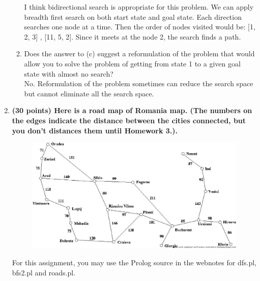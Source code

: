 \documentclass{article}%
\begin{document}
\begin{enumerate}
\begin{enumerate}
	I think bidirectional search is appropriate for this problem. We can apply breadth first search on both start state and goal state. Each direction searches one node at a time. Then the order of nodes visited would be: [1, 2, 3] , [11, 5, 2]. Since it meets at the node 2, the search finds a path.
	
	\item Does the answer to (c) suggest a reformulation of the problem that would allow you to
solve the problem of getting from state 1 to a given goal state with almost no search? \\

	No. Reformulation of the problem sometimes can reduce the search space but cannot eliminate all the search space.
\end{enumerate}
	
\item \textbf{(30 points) Here is a road map of Romania map. (The numbers on the edges indicate the distance between the cities connected, but you don't distances them until Homework 3.).}

\begin{figure}[h]
\centering
\includegraphics[scale=0.45, clip]{romania.eps} 
\vspace*{-2ex}
\end{figure}

For this assignment, you may use the Prolog source in the webnotes for dfs.pl, bfs2.pl and roads.pl. 


\end{enumerate}
\end{document}
